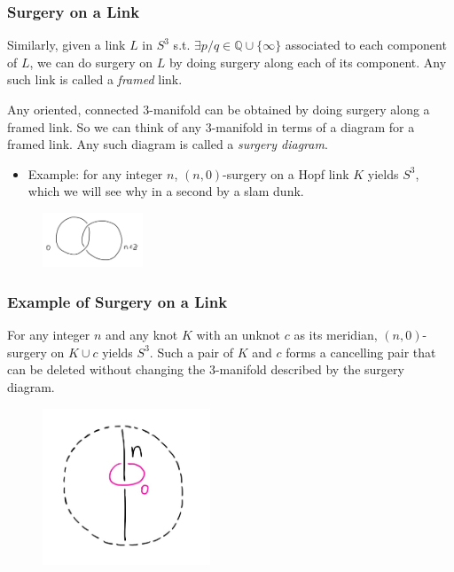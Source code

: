 \documentclass{beamer}
\theoremstyle{ex}
\theoremstyle{rem}
\begin{document}
	\begin{frame}
	\frametitle{Surgery on a Link}
		\begin{definition}
		Similarly, given a link $L$ in $S^3$ s.t. $\exists p/q \in \mathbb{Q}\cup\{\infty\}$ associated to each component of $L$, we can do surgery on $L$ by doing surgery along each of its component. Any such link is called a \textit{framed} link. 
		\end{definition}
		\begin{theorem}
		Any oriented, connected $3$-manifold can be obtained by doing surgery along a framed link. So we can think of any $3$-manifold in terms of a diagram for a framed link. Any such diagram is called a \textit{surgery diagram}. 
		\end{theorem}
		\begin{itemize}
		\item Example: for any integer $n$, $(n, 0)$-surgery on a Hopf link $K$ yields $S^3$, which we will see why in a second by a slam dunk. 		
		\end{itemize}
		\begin{figure}
			\centering
			\includegraphics[width=30mm]{Hopf.jpg}
		\end{figure}
	\end{frame}

	\begin{frame}
	\frametitle{Example of Surgery on a Link}
		\begin{theorem}
		For any integer $n$ and any knot $K$ with an unknot $c$ as its meridian, $(n, 0)$-surgery on $K \cup c$ yields $S^3$. Such a pair of $K$ and $c$ forms a cancelling pair that can be deleted without changing the $3$-manifold described by the surgery diagram.
		\end{theorem}
		\begin{figure}
			\centering
			\includegraphics[width=50mm]{Kc.jpg}
		\end{figure}
	\end{frame}
\end{document}
